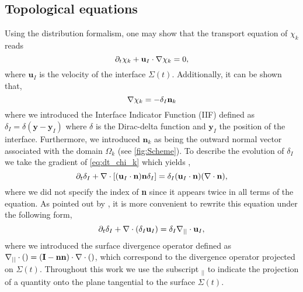 \subsection{Topological equations}
Using the distribution formalism, one may show that the transport equation of $\chi_k$ reads\citep{drew1983mathematical} 
\begin{equation}
    \partial_t \chi_k
    + \textbf{u}_I \cdot \mathbf{\nabla} \chi_k
    = 0,
    \label{eq:dt_chi_k}
\end{equation}
where $\textbf{u}_I$ is the velocity of the interface $\Sigma(t)$.
Additionally, it can be shown  \citep{drew1983mathematical} that,
\begin{equation}
    \mathbf{\nabla} \chi_k
    = - \delta_I \textbf{n}_k
    \label{eq:grad_chi_k}
\end{equation}
where we introduced the Interface Indicator Function (IIF) defined as $\delta_I = \delta(\textbf{y}-\textbf{y}_I)$ where $\delta$ is the Dirac-delta function and $\textbf{y}_I$ the position of the interface. 
Furthermore, we introduced $\textbf{n}_k$ as being the outward normal vector associated with the domain $\Omega_k$ (see \ref{fig:Scheme}).
To describe the evolution of $\delta_I$ we take the gradient of \ref{eq:dt_chi_k} which yields \citep{morel2015mathematical},
\begin{equation}
    \partial_t \delta_I
    + \mathbf{\nabla} \cdot \left[(\textbf{u}_I\cdot\textbf{n})\textbf{n} \delta_I\right]
    = \delta_I (\textbf{u}_I\cdot\textbf{n})(\mathbf{\nabla} \cdot\textbf{n}),
\end{equation}
where we did not specify the index of \textbf{n} since it appears twice in all terms of the equation. 
As pointed out by \citet{morel2007surface}, it is more convenient to rewrite this equation under the following form,
\begin{equation}
    \partial_t \delta_I
    + \mathbf{\nabla} \cdot (\delta_I \textbf{u}_I)
    = \delta_I \mathbf{\nabla}_{||} \cdot \textbf{u}_I,
    \label{eq:dt_delta_I}
\end{equation}
where we introduced the surface divergence operator defined as $\mathbf{\nabla}_{||} \cdot ()= (\textbf{I}-\textbf{nn})\cdot \mathbf{\nabla} \cdot ()$, which correspond to the divergence operator projected on $\Sigma(t)$. 
Throughout this work we use the subscript  $_{||}$ to indicate the projection of a quantity onto the plane tangential to the surface $\Sigma(t)$. 
